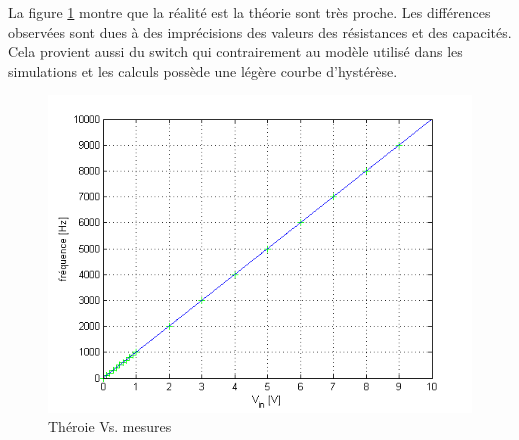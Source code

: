 La figure \ref{fig:theory_vs_mesure} montre que la réalité est la théorie sont très proche. Les différences observées sont dues à des imprécisions des valeurs des résistances et des capacités. Cela provient aussi du switch qui contrairement au modèle utilisé dans les simulations et les calculs possède une légère courbe d'hystérèse.
\begin{figure}
	\centering
	\includegraphics[scale=0.7]{img/vco_vs_reality.png}
	\caption{ Théroie Vs. mesures}
	\label{fig:theory_vs_mesure}
\end{figure}
